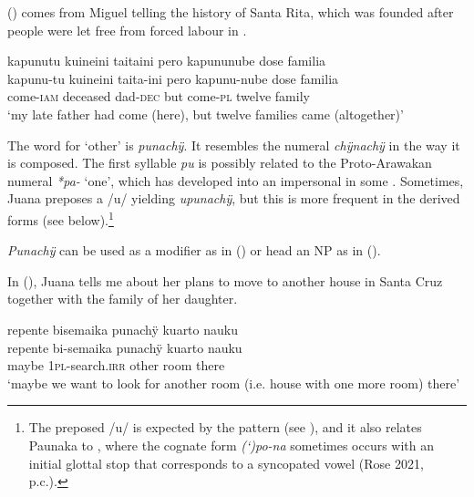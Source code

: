 () comes from Miguel telling the history of Santa Rita, which was founded after people were let free from forced labour in .

\ea\label{ex:twelve-2}
\begingl 
\glpreamble kapunutu kuineini taitaini pero kapununube dose familia\\
\gla kapunu-tu kuineini taita-ini pero kapunu-nube dose familia\\ 
\glb come-\textsc{iam} deceased dad-\textsc{dec} but come-\textsc{pl} twelve family\\ 
\glft ‘my late father had come (here), but twelve families came (altogether)’\\ 
\endgl
\trailingcitation{[mxx-p110825l.056]}
\xe

The word for ‘other’ is \textit{punachÿ}. It resembles the numeral \textit{chÿnachÿ} in the way it is composed. The first syllable \textit{pu} is possibly related to the Proto-Arawakan numeral \textit{*pa-} ‘one’, which has developed into an impersonal  in some  \citep[85]{Aikhenvald1999}. Sometimes, Juana preposes a /u/ yielding \textit{upunachÿ}, but this is more frequent in the derived forms (see below).\footnote{The preposed /u/ is expected by the  pattern (see ), and it also relates Paunaka to , where the cognate form \textit{(‘)po-na} sometimes occurs with an initial glottal stop that corresponds to a syncopated vowel (Rose 2021, p.c.).}

\textit{Punachÿ} can be used as a modifier as in () or head an NP as in (). 

In (), Juana tells me about her plans to move to another house in Santa Cruz together with the family of her daughter.

\ea\label{ex:other-2}
\begingl
\glpreamble repente bisemaika punachÿ kuarto nauku\\
\gla repente bi-semaika punachÿ kuarto nauku\\
\glb maybe 1\textsc{pl}-search.\textsc{irr} other room there\\
\glft ‘maybe we want to look for another room (i.e. house with one more room) there’
\endgl
\trailingcitation{[jxx-p120430l-1.355]}
\xe




